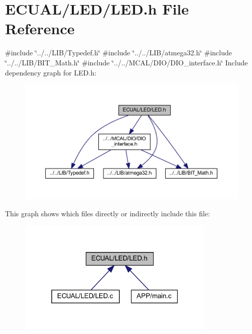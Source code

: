\section{E\+C\+U\+A\+L/\+L\+E\+D/\+L\+ED.h File Reference}
\label{_l_e_d_8h}
{\ttfamily \#include \char`\"{}../../\+L\+I\+B/\+Typedef.\+h\char`\"{}}\newline
{\ttfamily \#include \char`\"{}../../\+L\+I\+B/atmega32.\+h\char`\"{}}\newline
{\ttfamily \#include \char`\"{}../../\+L\+I\+B/\+B\+I\+T\+\_\+\+Math.\+h\char`\"{}}\newline
{\ttfamily \#include \char`\"{}../../\+M\+C\+A\+L/\+D\+I\+O/\+D\+I\+O\+\_\+interface.\+h\char`\"{}}\newline
Include dependency graph for L\+E\+D.\+h\+:\nopagebreak
\begin{figure}[H]
\begin{center}
\leavevmode
\includegraphics[width=350pt]{_l_e_d_8h__incl}
\end{center}
\end{figure}
This graph shows which files directly or indirectly include this file\+:\nopagebreak
\begin{figure}[H]
\begin{center}
\leavevmode
\includegraphics[width=268pt]{_l_e_d_8h__dep__incl}
\end{center}
\end{figure}

